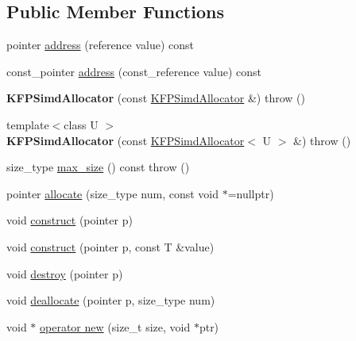 \subsection*{Public Member Functions}
\begin{DoxyCompactItemize}
\item 
pointer \hyperlink{classKFPSimdAllocator_a940fe6fc661958ebd72c192b3cfd9732}{address} (reference value) const 
\item 
const\+\_\+pointer \hyperlink{classKFPSimdAllocator_a2b6cce7e6d21f8f61e6d9eb577f03176}{address} (const\+\_\+reference value) const 
\item 
{\bfseries K\+F\+P\+Simd\+Allocator} (const \hyperlink{classKFPSimdAllocator}{K\+F\+P\+Simd\+Allocator} \&)  throw ()\hypertarget{classKFPSimdAllocator_ae3c869f7146830e3aa51609aaa469a1b}{}\label{classKFPSimdAllocator_ae3c869f7146830e3aa51609aaa469a1b}

\item 
{\footnotesize template$<$class U $>$ }\\{\bfseries K\+F\+P\+Simd\+Allocator} (const \hyperlink{classKFPSimdAllocator}{K\+F\+P\+Simd\+Allocator}$<$ U $>$ \&)  throw ()\hypertarget{classKFPSimdAllocator_a519e1267b4c04f9d3c2edcbab9026f81}{}\label{classKFPSimdAllocator_a519e1267b4c04f9d3c2edcbab9026f81}

\item 
size\+\_\+type \hyperlink{classKFPSimdAllocator_a5cb432db266d47facaa932576c899602}{max\+\_\+size} () const   throw ()
\item 
pointer \hyperlink{classKFPSimdAllocator_a6112376bd53f74b5c360c5d9ee7d1867}{allocate} (size\+\_\+type num, const void $\ast$=nullptr)
\item 
void \hyperlink{classKFPSimdAllocator_a4e7732dacbbea0ed92224c9295d14f56}{construct} (pointer p)
\item 
void \hyperlink{classKFPSimdAllocator_a206aeadc9db52a9918be232606710eea}{construct} (pointer p, const T \&value)
\item 
void \hyperlink{classKFPSimdAllocator_a654bc8b82b27fe73c14e87d9f3a73b9e}{destroy} (pointer p)
\item 
void \hyperlink{classKFPSimdAllocator_a09742f45872a8568926482ba76f49762}{deallocate} (pointer p, size\+\_\+type num)
\item 
void $\ast$ \hyperlink{classKFPSimdAllocator_a04f7288a8003d7c446d194174faa9d85}{operator new} (size\+\_\+t size, void $\ast$ptr)\hypertarget{classKFPSimdAllocator_a04f7288a8003d7c446d194174faa9d85}{}\label{classKFPSimdAllocator_a04f7288a8003d7c446d194174faa9d85}


\end{DoxyCompactItemize}
